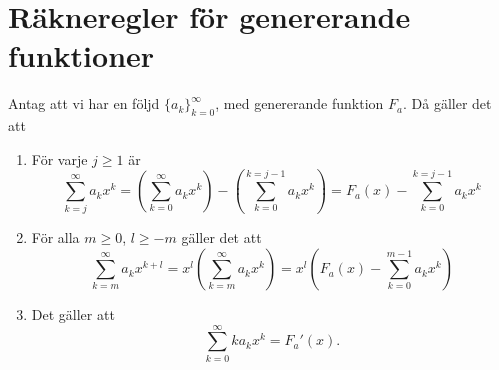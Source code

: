 \documentclass[nobib]{tufte-handout}
\begin{document}
  \section{Räkneregler för genererande funktioner}

  \begin{lemma}
    Antag att vi har en följd $\{a_k\}_{k=0}^\infty$, med genererande funktion $F_a$. Då gäller det att
    \begin{enumerate}
        \item För varje $j \geq 1$ är
        $$\sum_{k = j}^{\infty} a_k x^k = \left(\sum_{k=0}^{\infty}a_k x^k\right) - \left(\sum_{k=0}^{k=j-1} a_kx^k\right) = F_a(x) - \sum_{k=0}^{k=j-1} a_kx^k$$
        \item För alla $m \geq 0$, $l \geq -m$ gäller det att
        $$\sum_{k=m}^{\infty} a_k x^{k + l} = x^l\left(\sum_{k=m}^{\infty} a_k x^{k}\right) = x^l\left(F_a(x) - \sum_{k=0}^{m-1} a_k x^k\right)$$
        \item Det gäller att
        $$\sum_{k=0}^{\infty} k a_k x^k = F_a'(x).$$
        
    \end{enumerate}
\end{lemma}

%
%
\end{document}
